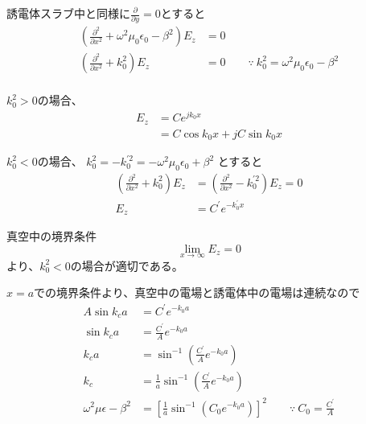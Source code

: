 \documentclass[a4paper,10pt]{bxjsarticle}
\begin{document}
誘電体スラブ中と同様に$\frac{\partial}{\partial y} = 0$とすると
\begin{align*}
    \left( 
        \frac{\partial^2}{\partial x^2} 
        + \omega^2 \mu_0 \epsilon_0 - \beta^2 
    \right) E_z
    & = 0 \\
    \left( 
        \frac{\partial^2}{\partial x^2} 
        + k_0^2
    \right) E_z
    & = 0 \qquad
    \because \ k_0^2 = \omega^2 \mu_0 \epsilon_0 - \beta^2 \\
\end{align*}

$k_0^2 > 0$の場合、
\begin{align*}
    E_z &= C e^{j k_0 x} \\
        &= C \cos k_0 x + j C \sin k_0 x
\end{align*}

$k_0^2 < 0$の場合、
$k_0^2 = - k_0^{\prime 2} = - \omega^2 \mu_0 \epsilon_0 + \beta^2$ とすると
\begin{align*}
    \left( 
        \frac{\partial^2}{\partial x^2} 
        + k_0^2
    \right) E_z
    & =
    \left( 
        \frac{\partial^2}{\partial x^2} 
        - k_0^{\prime 2}
    \right) E_z
    = 0 \\
    E_z &= C^\prime e^{- k_0^\prime x}
\end{align*}

真空中の境界条件 
$$\lim_{x \to \infty} E_z = 0$$
より、$k_0^2 < 0$の場合が適切である。

$x=a$での境界条件より、真空中の電場と誘電体中の電場は連続なので
\begin{align*}
    A \sin k_c a & = C^\prime e^{- k_0 a} \\
    \sin k_c a & = \frac{C^\prime}{A} e^{- k_0 a} \\
    k_c a & = \sin^{-1} \left( \frac{C^\prime}{A} e^{- k_0 a} \right) \\
    k_c & = \frac{1}{a} \sin^{-1} \left( \frac{C^\prime}{A} e^{- k_0 a} \right) \\
    \omega^2 \mu \epsilon - \beta^2 &= 
        \left[ 
            \frac{1}{a} \sin^{-1} \left( C_0 e^{- k_0 a} \right)
        \right]^2 \qquad
    \because \ C_0 = \frac{C^\prime}{A}
\end{align*}




  
\end{document}
